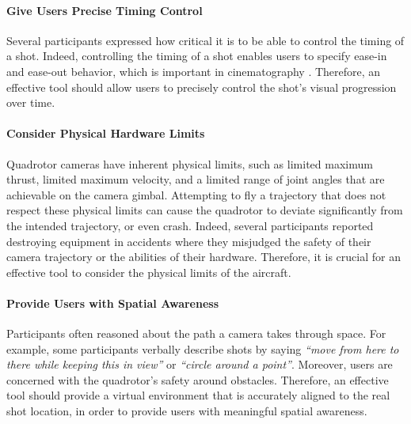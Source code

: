 \paragraph{Give Users Precise Timing Control}
Several participants expressed how critical it is to be able to control the timing of a shot.
Indeed, controlling the timing of a shot enables users to specify ease-in and ease-out behavior, which is important in cinematography \cite{arijon:1976,lasseter:1987}.
Therefore, an effective tool should allow users to precisely control the shot's visual progression over time.

\paragraph{Consider Physical Hardware Limits} 
Quadrotor cameras have inherent physical limits, such as limited maximum thrust, limited maximum velocity, and a limited range of joint angles that are achievable on the camera gimbal.
Attempting to fly a trajectory that does not respect these physical limits can cause the quadrotor to deviate significantly from the intended trajectory, or even crash.
Indeed, several participants reported destroying equipment in accidents where they misjudged the safety of their camera trajectory or the abilities of their hardware.
Therefore, it is crucial for an effective tool to consider the physical limits of the aircraft.

\paragraph{Provide Users with Spatial Awareness}
Participants often reasoned about the path a camera takes through space.
For example, some participants verbally describe shots by saying \emph{``move from here to there while keeping this in view''} or \emph{``circle around a point''}.
Moreover, users are concerned with the quadrotor's safety around obstacles.
Therefore, an effective tool should provide a virtual environment that is accurately aligned to the real shot location, in order to provide users with meaningful spatial awareness.

